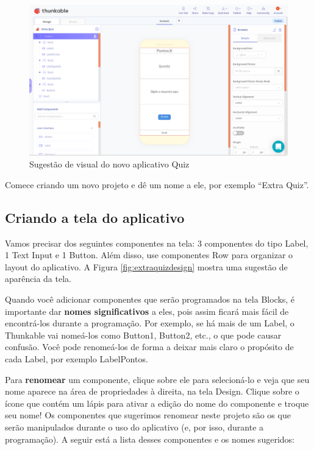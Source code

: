 \documentclass[11pt,fleqn]{book} %
\begin{document}
\begin{figure}[H]
	\centering
    \includegraphics[width=\textwidth]{Pictures/GuiaThunkExtraQuizDesign.png}
    \caption{Sugestão de visual do novo aplicativo Quiz}\label{fig:extraquizdesign}
    \label{fig:guia35}
\end{figure}

Comece criando um novo projeto e dê um nome a ele, por exemplo ``Extra Quiz''. 
\subsection{Criando a tela do aplicativo}

Vamos precisar dos seguintes componentes na tela: 3 componentes do tipo Label, 1 Text Input e 1 Button. Além disso, use componentes Row para organizar o layout do aplicativo. A Figura \ref{fig:extraquizdesign} mostra uma sugestão de aparência da tela.


Quando você adicionar componentes que serão programados na tela Blocks, é importante dar \textbf{nomes significativos} a eles, pois assim ficará mais fácil de encontrá-los durante a programação. Por exemplo, se há mais de um Label, o Thunkable vai nomeá-los como Button1, Button2, etc., o que pode causar confusão. Você pode renomeá-los de forma a deixar mais claro o propósito de cada Label, por exemplo LabelPontos. 

Para \textbf{renomear} um componente, clique sobre ele para selecioná-lo e veja que seu nome aparece na área de propriedades à direita, na tela Design. Clique sobre o ícone que contém um lápis para ativar a edição do nome do componente e troque seu nome! Os componentes que sugerimos renomear neste projeto são os que serão manipulados durante o uso do aplicativo (e, por isso, durante a programação). A seguir está a lista desses componentes e os nomes sugeridos:
\end{document}
